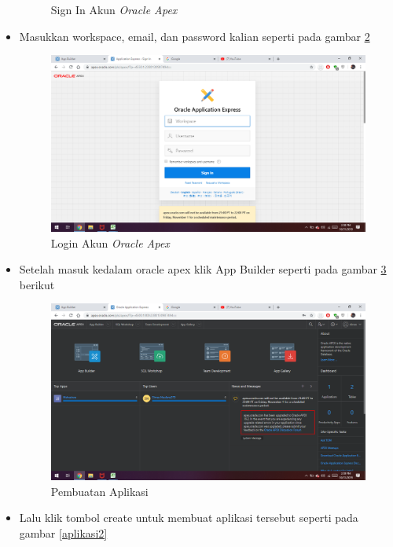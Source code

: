 \documentclass[12pt, times new roman, a4paper]{article}
\begin{document}
\begin{itemize}
\begin{figure}[!htbp]
        \caption{Sign In Akun \textit{Oracle Apex}}
        \label{login1}
    \end{figure}
    \item Masukkan workspace, email, dan password kalian seperti pada gambar \ref{login2}
        \begin{figure}[!htbp]
        \centering
        \includegraphics[scale=0.23]{figures/login2.png}
        \caption{Login Akun \textit{Oracle Apex}}
        \label{login2}
    \end{figure}
    \item Setelah masuk kedalam oracle apex klik App Builder seperti pada gambar \ref{aplikasi1} berikut
        \begin{figure}[!htbp]
        \centering
        \includegraphics[scale=0.25]{figures/aplikasi1.png}
        \caption{Pembuatan Aplikasi}
        \label{aplikasi1}
    \end{figure}
    \item Lalu klik tombol create untuk membuat aplikasi tersebut seperti pada gambar \ref{aplikasi2}
            \begin{figure}[!htbp]

\end{figure}
\end{itemize}
\end{document}
